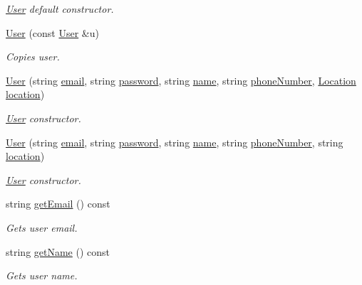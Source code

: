 \begin{DoxyCompactItemize}
\begin{DoxyCompactList}\small\item\em \hyperlink{class_user}{User} default constructor. \end{DoxyCompactList}\item 
\hyperlink{class_user_a018a343a483ee5d702fc11c3d6383ac7}{User} (const \hyperlink{class_user}{User} \&u)
\begin{DoxyCompactList}\small\item\em Copies user. \end{DoxyCompactList}\item 
\hyperlink{class_user_a7cc314f439fc19daa7303aa31f3e6798}{User} (string \hyperlink{class_user_a2d678acd22b533660b4b7d8404961f14}{email}, string \hyperlink{class_user_ab537b9a55bc7d7fcafcdf8e53d085e67}{password}, string \hyperlink{class_user_a643f85779a4693855c171c396f49e515}{name}, string \hyperlink{class_user_a727ba647fe019be6fa9c03308d60da9e}{phone\+Number}, \hyperlink{class_location}{Location} \hyperlink{class_user_a1c8e68a346c8a47d8cf0e75356c66562}{location})
\begin{DoxyCompactList}\small\item\em \hyperlink{class_user}{User} constructor. \end{DoxyCompactList}\item 
\hyperlink{class_user_aa0732588c5bd4db4f7f6310e788abacf}{User} (string \hyperlink{class_user_a2d678acd22b533660b4b7d8404961f14}{email}, string \hyperlink{class_user_ab537b9a55bc7d7fcafcdf8e53d085e67}{password}, string \hyperlink{class_user_a643f85779a4693855c171c396f49e515}{name}, string \hyperlink{class_user_a727ba647fe019be6fa9c03308d60da9e}{phone\+Number}, string \hyperlink{class_user_a1c8e68a346c8a47d8cf0e75356c66562}{location})
\begin{DoxyCompactList}\small\item\em \hyperlink{class_user}{User} constructor. \end{DoxyCompactList}\item 
string \hyperlink{class_user_ac8a15550f3596a7ef13eb31b82a8ecf6}{get\+Email} () const 
\begin{DoxyCompactList}\small\item\em Gets user email. \end{DoxyCompactList}\item 
string \hyperlink{class_user_a2b2a3d00d303affb4f5674bc9788db52}{get\+Name} () const 
\begin{DoxyCompactList}\small\item\em Gets user name. \end{DoxyCompactList}\item 

\end{DoxyCompactItemize}
